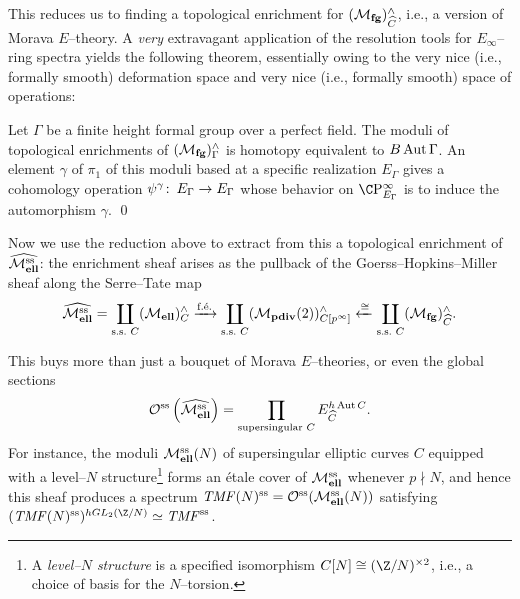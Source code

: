 This reduces us to finding a topological enrichment for \((\mathcal{M}_{\mathbf{fg}})^\wedge_{\widehat{C}}\), i.e., a version of Morava \(E\)--theory.  A \emph{very} extravagant application of the resolution tools for \(E_\infty\)--ring spectra yields the following theorem, essentially owing to the very nice (i.e., formally smooth) deformation space and very nice (i.e., formally smooth) space of operations:

\begin{theorem}\label{GHMTheoremForEThy}\label{obstruction theory}
Let \(\Gamma\) be a finite height formal group over a perfect field.  The moduli of topological enrichments of \((\mathcal{M}_{\mathbf{fg}})^\wedge_\Gamma\) is homotopy equivalent to \(B\operatorname{Aut} \Gamma\).  An element \(\gamma\) of \(\pi_1\) of this moduli based at a specific realization \(E_\Gamma\) gives a cohomology operation \(\psi^\gamma\colon\thinspace E_\Gamma \to E_\Gamma\) whose behavior on \(\CP^\infty_{E_\Gamma}\) is to induce the automorphism \(\gamma\). \qed
\end{theorem}

Now we use the reduction above to extract from this a topological enrichment of \(\widehat{\mathcal{M}_{\mathbf{ell}}^{\mathrm{ss}}}\): the enrichment sheaf arises as the pullback of the Goerss--Hopkins--Miller sheaf along the Serre--Tate map \[\widehat{\mathcal{M}_{\mathbf{ell}}^{\mathrm{ss}}} = \coprod_{\text{s.s.\ \(C\)}} (\mathcal{M}_{\mathbf{ell}})^\wedge_C \xrightarrow{\text{f.\'e.}} \coprod_{\text{s.s.\ \(C\)}} (\mathcal{M}_{\mathbf{pdiv}}(2))^\wedge_{C[p^\infty]} \xleftarrow{\cong} \coprod_{\text{s.s.\ \(C\)}} (\mathcal{M}_{\mathbf{fg}})^\wedge_{\widehat C}.\]

\begin{remark}
This buys more than just a bouquet of Morava \(E\)--theories, or even the global sections \[\mathcal{O}^{\mathrm{ss}}\left(\widehat{\mathcal{M}_{\mathbf{ell}}^{\mathrm{ss}}}\right) = \prod_{\text{supersingular \(C\)}} E_{\widehat C}^{h\operatorname{Aut} C}.\]  For instance, the moduli \(\mathcal{M}_{\mathbf{ell}}^{\mathrm{ss}}(N)\) of supersingular elliptic curves \(C\) equipped with a level--\(N\) structure\footnote{A \textit{level--\(N\) structure} is a specified isomorphism \(C[N] \cong (\Z/N)^{\times 2}\), i.e., a choice of basis for the \(N\)--torsion.} forms an \'etale cover of \(\mathcal{M}_{\mathbf{ell}}^{\mathrm{ss}}\) whenever \(p \nmid N\), and hence this sheaf produces a spectrum \(\mathit{TMF}(N)^{\mathrm{ss}} = \mathcal{O}^{\mathrm{ss}}(\mathcal{M}_{\mathbf{ell}}^{\mathrm{ss}}(N))\) satisfying \((\TMF(N)^{\ss})^{hGL_2(\Z/N)} \simeq \TMF^{\ss}\).
\end{remark}







